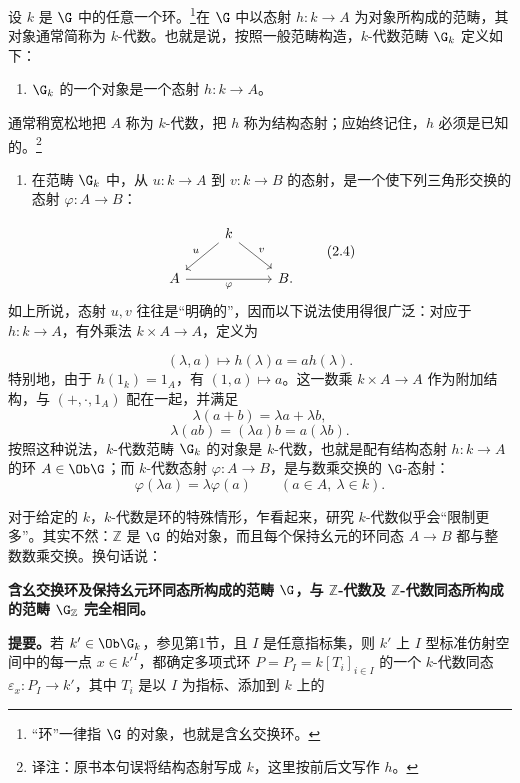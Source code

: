 设 $k$ 是 $\G$ 中的任意一个环。\footnote{“环”一律指 $\G$ 的对象，也就是含幺交换环。}在 $\G$ 中以态射 $h:k\to A$ 为对象所构成的范畴，其对象通常简称为 $k$-代数。也就是说，按照一般范畴构造，$k$-代数范畴 $\G_k$ 定义如下：
\begin{enumerate}[label=\arabic*)]
\item $\G_k$ 的一个对象是一个态射 $h:k\to A$。
\end{enumerate}
通常稍宽松地把 $A$ 称为 $k$-代数，把 $h$ 称为结构态射；应始终记住，$h$ 必须是已知的。\footnote{译注：原书本句误将结构态射写成 $k$，这里按前后文写作 $h$。}
\begin{enumerate}[label=\arabic*),start=2]
\item 在范畴 $\G_k$ 中，从 $u:k\to A$ 到 $v:k\to B$ 的态射，是一个使下列三角形交换的态射 $\varphi:A\to B$：
\end{enumerate}
\[
\begin{tikzcd}[ampersand replacement=\&]
\&k\arrow[dl,"u"']\arrow[dr,"v"]\&\\
A\arrow[rr,"\varphi"']\&\&B.
\end{tikzcd}\tag{2.4}
\]
如上所说，态射 $u,v$ 往往是“明确的”，因而以下说法使用得很广泛：对应于 $h:k\to A$，有外乘法 $k\times A\to A$，定义为

\[
(\lambda,a)\longmapsto h(\lambda)a=ah(\lambda).\tag{2.5}
\]
特别地，由于 $h(1_k)=1_A$，有 $(1,a)\mapsto a$。这一数乘 $k\times A\to A$ 作为附加结构，与 $(+,\cdot,1_A)$ 配在一起，并满足
\[
\lambda(a+b)=\lambda a+\lambda b,\tag{2.6}
\]
\[
\lambda(ab)=(\lambda a)b=a(\lambda b).\tag{2.7}
\]
按照这种说法，$k$-代数范畴 $\G_k$ 的对象是 $k$-代数，也就是配有结构态射 $h:k\to A$ 的环 $A\in\Ob\G$；而 $k$-代数态射 $\varphi:A\to B$，是与数乘交换的 $\G$-态射：
\[
\varphi(\lambda a)=\lambda\varphi(a)
\qquad(a\in A,\ \lambda\in k).\tag{2.8}
\]

对于给定的 $k$，$k$-代数是环的特殊情形，乍看起来，研究 $k$-代数似乎会“限制更多”。其实不然：$\mathbb Z$ 是 $\G$ 的始对象，而且每个保持幺元的环同态 $A\to B$ 都与整数数乘交换。换句话说：

\textbf{含幺交换环及保持幺元环同态所构成的范畴 $\G$，与 $\mathbb Z$-代数及 $\mathbb Z$-代数同态所构成的范畴 $\G_{\mathbb Z}$ 完全相同。}

\textbf{提要。}若 $k'\in\Ob\G_k$，参见第1节，且 $I$ 是任意指标集，则 $k'$ 上 $I$ 型标准仿射空间中的每一点 $x\in k'^I$，都确定多项式环 $P=P_I=k[T_i]_{i\in I}$ 的一个 $k$-代数同态 $\varepsilon_x:P_I\to k'$，其中 $T_i$ 是以 $I$ 为指标、添加到 $k$ 上的

